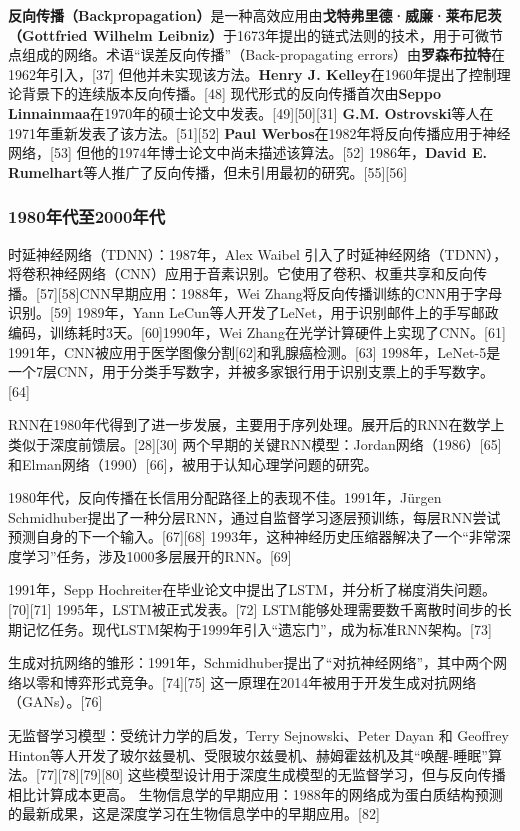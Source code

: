 \textbf{反向传播（Backpropagation）}是一种高效应用由\textbf{戈特弗里德·威廉·莱布尼茨（Gottfried Wilhelm Leibniz）}于1673年提出的链式法则的技术，用于可微节点组成的网络。术语“误差反向传播”（Back-propagating errors）由\textbf{罗森布拉特}在1962年引入，[37] 但他并未实现该方法。\textbf{Henry J. Kelley}在1960年提出了控制理论背景下的连续版本反向传播。[48] 现代形式的反向传播首次由\textbf{Seppo Linnainmaa}在1970年的硕士论文中发表。[49][50][31] \textbf{G.M. Ostrovski}等人在1971年重新发表了该方法。[51][52] \textbf{Paul Werbos}在1982年将反向传播应用于神经网络，[53] 但他的1974年博士论文中尚未描述该算法。[52] 1986年，\textbf{David E. Rumelhart}等人推广了反向传播，但未引用最初的研究。[55][56]
\subsubsection{1980年代至2000年代}
时延神经网络（TDNN）：1987年，Alex Waibel 引入了时延神经网络（TDNN），将卷积神经网络（CNN）应用于音素识别。它使用了卷积、权重共享和反向传播。[57][58]CNN早期应用：1988年，Wei Zhang将反向传播训练的CNN用于字母识别。[59] 1989年，Yann LeCun等人开发了LeNet，用于识别邮件上的手写邮政编码，训练耗时3天。[60]1990年，Wei Zhang在光学计算硬件上实现了CNN。[61] 1991年，CNN被应用于医学图像分割[62]和乳腺癌检测。[63] 1998年，LeNet-5是一个7层CNN，用于分类手写数字，并被多家银行用于识别支票上的手写数字。[64]  

RNN在1980年代得到了进一步发展，主要用于序列处理。展开后的RNN在数学上类似于深度前馈层。[28][30] 两个早期的关键RNN模型：Jordan网络（1986）[65]和Elman网络（1990）[66]，被用于认知心理学问题的研究。

1980年代，反向传播在长信用分配路径上的表现不佳。1991年，Jürgen Schmidhuber提出了一种分层RNN，通过自监督学习逐层预训练，每层RNN尝试预测自身的下一个输入。[67][68]  1993年，这种神经历史压缩器解决了一个“非常深度学习”任务，涉及1000多层展开的RNN。[69]  

1991年，Sepp Hochreiter在毕业论文中提出了LSTM，并分析了梯度消失问题。[70][71] 1995年，LSTM被正式发表。[72] LSTM能够处理需要数千离散时间步的长期记忆任务。现代LSTM架构于1999年引入“遗忘门”，成为标准RNN架构。[73]  

生成对抗网络的雏形：1991年，Schmidhuber提出了“对抗神经网络”，其中两个网络以零和博弈形式竞争。[74][75] 这一原理在2014年被用于开发生成对抗网络（GANs）。[76]  

无监督学习模型：受统计力学的启发，Terry Sejnowski、Peter Dayan 和 Geoffrey Hinton等人开发了玻尔兹曼机、受限玻尔兹曼机、赫姆霍兹机及其“唤醒-睡眠”算法。[77][78][79][80] 这些模型设计用于深度生成模型的无监督学习，但与反向传播相比计算成本更高。 生物信息学的早期应用：1988年的网络成为蛋白质结构预测的最新成果，这是深度学习在生物信息学中的早期应用。[82]  

